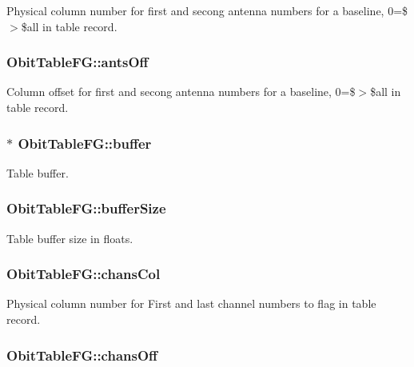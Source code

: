 Physical column number for first and secong antenna numbers for a baseline, 0=\$$>$\$all in table record. 

\subsubsection{ {\bf Obit\-Table\-FG::ants\-Off}}\label{structObitTableFG_o21}


Column offset for first and secong antenna numbers for a baseline, 0=\$$>$\$all in table record. 

\subsubsection{$\ast$ {\bf Obit\-Table\-FG::buffer}}\label{structObitTableFG_o10}


Table buffer. 

\subsubsection{ {\bf Obit\-Table\-FG::buffer\-Size}}\label{structObitTableFG_o11}


Table buffer size in floats. 

\subsubsection{ {\bf Obit\-Table\-FG::chans\-Col}}\label{structObitTableFG_o28}


Physical column number for First and last channel numbers to flag in table record. 

\subsubsection{ {\bf Obit\-Table\-FG::chans\-Off}}\label{structObitTableFG_o27}


